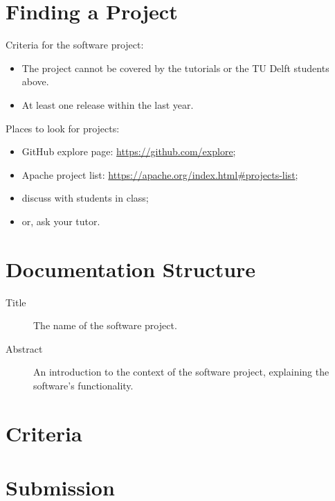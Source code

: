 \documentclass{csse4400}
\begin{document}
\section{Finding a Project}
Criteria for the software project:
\begin{itemize}
    \item The project cannot be covered by the tutorials or the TU Delft students above.
    \item At least one release within the last year.
\end{itemize}

\noindent Places to look for projects:
\begin{itemize}
    \item GitHub explore page: \url{https://github.com/explore};
    \item Apache project list: \url{https://apache.org/index.html#projects-list};
    \item discuss with students in class;
    \item or, ask your tutor.
\end{itemize}

\section{Documentation Structure}

\begin{description}
    \item[Title] The name of the software project.
    \item[Abstract] An introduction to the context of the software project, explaining the software's functionality.
\end{description}

\section{Criteria}

\section{Submission}
\end{document}
